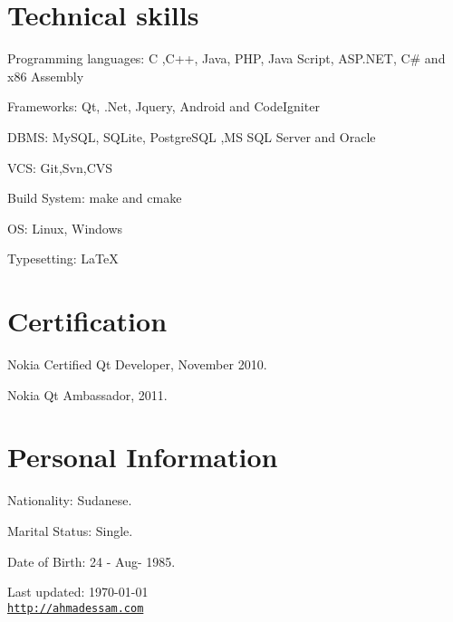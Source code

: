 \documentclass[letterpaper]{article}
\def\footerlink{http://ahmadessam.com}
\renewenvironment{itemize}{
  \begin{list}{}{
    \setlength{\leftmargin}{1.5em}
  }
}{
  \end{list}
}
\begin{document}
\section*{Technical skills}
\begin{itemize}
\item Programming languages: {\small C ,C++, Java, PHP, Java Script, ASP.NET, C\# and x86 Assembly}
\item Frameworks: {\small Qt, .Net, Jquery, Android and CodeIgniter}
\item DBMS: {\small MySQL, SQLite, PostgreSQL ,MS SQL Server and Oracle}
\item VCS: {\small Git,Svn,CVS}
\item Build System: {\small make and cmake}
\item OS: {\small Linux, Windows}
\item Typesetting: {\small \LaTeX{}}
\end{itemize}

\section*{Certification}
\begin{itemize}
\item Nokia Certified Qt Developer, November 2010.
\item Nokia Qt Ambassador, 2011.
\end{itemize}



\section*{Personal Information}
\begin{itemize}
\item Nationality: {\small Sudanese.}
\item Marital Status: {\small Single.}
\item Date of Birth: {\small 24 - Aug- 1985.}
\end{itemize}

\bigskip

\begin{center}
  \begin{footnotesize}
    Last updated: \today \\
    \href{\footerlink}{\texttt{\footerlink}}
  \end{footnotesize}
\end{center}
\end{document}
